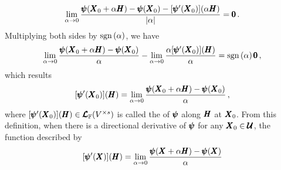 \begin{equation*}
\lim_{\alpha\to 0} \dfrac{\pmb{\psi}(\pmb{X}_0+\alpha\pmb{H})-\pmb{\psi}(\pmb{X}_0)-[\pmb{\psi}'(\pmb{X}_0)](\alpha\pmb{H})}{|\alpha|}=\pmb{0}\,.
\end{equation*}
Multiplying both sides by $\mathop{\mathrm{sgn}}\left ( \alpha\right )$, we have
\begin{equation*}
\lim_{\alpha\to 0} \dfrac{\pmb{\psi}(\pmb{X}_0+\alpha\pmb{H})-\pmb{\psi}(\pmb{X}_0)}{\alpha}-\lim_{\alpha\to 0} \dfrac{\alpha[\pmb{\psi}'(\pmb{X}_0)](\pmb{H})}{\alpha}=\mathop{\mathrm{sgn}}\left ( \alpha\right )\pmb{0}\,,
\end{equation*}
which results
\begin{equation}
[\pmb{\psi}'(\pmb{X}_0)](\pmb{H})=\lim_{\alpha\to 0} \dfrac{\pmb{\psi}(\pmb{X}_0+\alpha\pmb{H})-\pmb{\psi}(\pmb{X}_0)}{\alpha}\,,
\end{equation}
where $[\pmb{\psi}'(\pmb{X}_0)](\pmb{H})\in\pmb{\mathcal{L}}_{\mathbb{F}}(V^{\times s})$ is called the  of $\pmb{\psi}$ along $\pmb{H}$ at $\pmb{X}_0$. From this definition, when there is a directional derivative of $\pmb{\psi}$ for any $\pmb{X}_0\in\pmb{\mathcal{U}}$, the function described by
\begin{equation}\label{eq:directDeriv}
[\pmb{\psi}'(\pmb{X})](\pmb{H})=\lim_{\alpha\to 0} \dfrac{\pmb{\psi}(\pmb{X}+\alpha\pmb{H})-\pmb{\psi}(\pmb{X})}{\alpha}
\end{equation}
